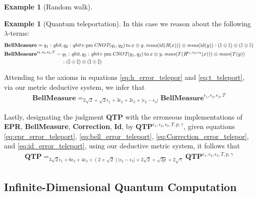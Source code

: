 \documentclass[10pt,a4paper]{amsart}
\theoremstyle{definition}
\theoremstyle{definition}
\newtheorem{example}[definition]{Example}
\theoremstyle{definition}
\theoremstyle{definition}
\theoremstyle{definition}
\theoremstyle{definition}
\begin{document}
\begin{example}[Random walk]
\begin{example}[Quantum teleportation]
    In this case we reason about the following $\lambda$-terms:
    \begin{align*}
      &\textbf{BellMeasure} =  q_{1}: \textit{qbit}, q_{2}: \textit{qbit}
      \vljud  \text{pm} \, \textit{CNOT} (q_{1},q_{2})
     \,  \text{to}\, x \otimes y. \,
      \textit{meas} (\id(\textit{H} (x))) \otimes \textit{meas} ( \id(y)) :
      \left(\typeI\oplus \typeI\right) \otimes \left(\typeI\oplus
      \typeI\right) \\
      &\textbf{BellMeasure}^{\epsilon_1, \epsilon_2,\epsilon_3,T} =  q_{1}: \textit{qbit}, q_{2}: \textit{qbit}
      \vljud  \text{pm} \, \textit{CNOT} (q_{1},q_{2})
     \,  \text{to}\, x \otimes y. \,
      \textit{meas} (T(\textit{H}^{\epsilon_1, \epsilon_2,\epsilon_3} (x))) \otimes \textit{meas} ( T(y)) \\
      &\hspace{110pt}:\left(\typeI\oplus \typeI\right) \otimes \left(\typeI\oplus
      \typeI\right) \\
    \end{align*}
  
  Attending to the axioms in equations \eqref{eq:h_error_telepor} and \eqref{eq:t_teleport}, via our metric deductive system, we infer that
  \begin{align} \label{eq:bell_error_teleport}
    \textbf{BellMeasure} =_{2 \sqrt{2} + \sqrt{2}\epsilon_1 + 3\epsilon_2 + 2\epsilon_3 + |\epsilon_2-\epsilon_3|} \textbf{BellMeasure}^{\epsilon_1, \epsilon_2,\epsilon_3,T}
  \end{align}

  Lastly, designating the judgment \textbf{QTP} with the erroneous implementations of \textbf{EPR}, \textbf{BellMeasure}, \textbf{Correction}, \textbf{Id}, by $\textbf{QTP}^{\epsilon_1, \epsilon_2,\epsilon_3,T,p,\gamma}$, given equations \eqref{eq:epr_error_teleport}, \eqref{eq:bell_error_teleport}, \eqref{eq:Correction_error_telepor}, and  \eqref{eq:id_error_teleport}, using our deductive metric system, it follows that
  \begin{align*}
    \textbf{QTP} =_{ 3\sqrt{2}\epsilon_1 + 6\epsilon_2 + 4\epsilon_3 + (2+\sqrt{2})|\epsilon_2-\epsilon_3| + 2 \sqrt{2} + \sqrt{2p}  +2\sqrt{\gamma}} \textbf{QTP}^{\epsilon_1, \epsilon_2,\epsilon_3,T,p,\gamma}
  \end{align*}
  \end{example}



  


\subsection{Infinite-Dimensional Quantum Computation}


\end{example}
\end{document}
